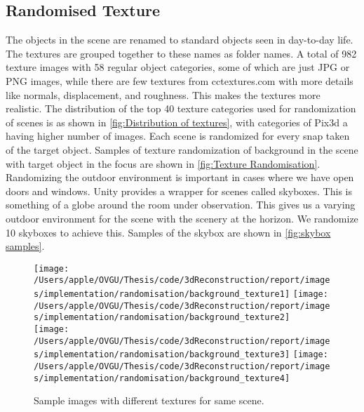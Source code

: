 \subsection{Randomised Texture}\label{subsec:randomised-texture}

The objects in the scene are renamed to standard objects seen in day-to-day life.
The textures are grouped together to these names as folder names.
A total of 982 texture images with 58 regular object categories, some of which are just JPG or PNG images, while there are few textures from cctextures.com with more details like normals, displacement, and roughness.
This makes the textures more realistic.
The distribution of the top 40 texture categories used for randomization of scenes is as shown in \autoref{fig:Distribution of textures}, with categories of Pix3d a having higher number of images.
Each scene is randomized for every snap taken of the target object.
Samples of texture randomization of background in the scene with target object in the focus are shown in \autoref{fig:Texture Randomisation}.
Randomizing the outdoor environment is important in cases where we have open doors and windows.
Unity provides a wrapper for scenes called skyboxes.
This is something of a globe around the room under observation.
This gives us a varying outdoor environment for the scene with the scenery at the horizon.
We randomize 10 skyboxes to achieve this.
Samples of the skybox are shown in \autoref{fig:skybox samples}.


\begin{figure}
    \centering
    \texttt{[image: /Users/apple/OVGU/Thesis/code/3dReconstruction/report/images/implementation/randomisation/background\_texture1]}
    \texttt{[image: /Users/apple/OVGU/Thesis/code/3dReconstruction/report/images/implementation/randomisation/background\_texture2]}\\
    \vspace{0.1cm}
    \texttt{[image: /Users/apple/OVGU/Thesis/code/3dReconstruction/report/images/implementation/randomisation/background\_texture3]}
    \texttt{[image: /Users/apple/OVGU/Thesis/code/3dReconstruction/report/images/implementation/randomisation/background\_texture4]}\\
    \caption{Sample images with different textures for same scene.}
    \label{fig:Texture Randomisation}
\end{figure}


